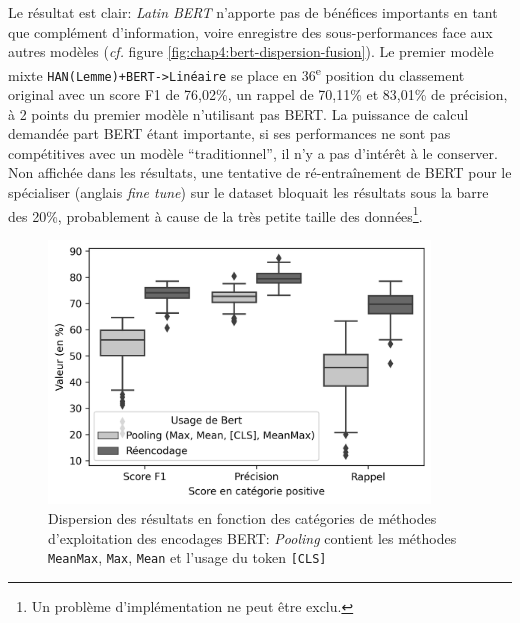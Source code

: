 Le résultat est clair: \textit{Latin BERT} n'apporte pas de bénéfices importants en tant que complément d'information, voire enregistre des sous-performances face aux autres modèles (\textit{cf.} figure \ref{fig:chap4:bert-dispersion-fusion}). Le premier modèle mixte \texttt{HAN(Lemme)+BERT->Linéaire} se place en 36\textsuperscript{e} position du classement original avec un score F1 de 76,02\%, un rappel de 70,11\% et 83,01\% de précision, à 2 points du premier modèle n'utilisant pas BERT. La puissance de calcul demandée part BERT étant importante, si ses performances ne sont pas compétitives avec un modèle \enquote{traditionnel}, il n'y a pas d'intérêt à le conserver. Non affichée dans les résultats, une tentative de ré-entraînement de BERT pour le spécialiser (anglais \textit{fine tune}) sur le dataset bloquait les résultats sous la barre des 20\%, probablement à cause de la très petite taille des données\footnote{Un problème d'implémentation ne peut être exclu.}.

\begin{figure}[ht]
    \centering
    \includegraphics[height=7cm]{figures/chap4/BertPoolingGeneric.png}
    \caption{Dispersion des résultats en fonction des catégories de méthodes d'exploitation des encodages BERT: \textit{Pooling} contient les méthodes \texttt{MeanMax}, \texttt{Max}, \texttt{Mean} et l'usage du token \texttt{[CLS]}}
    \label{fig:chap4:bert-pooling-generic-eval}
\end{figure}

